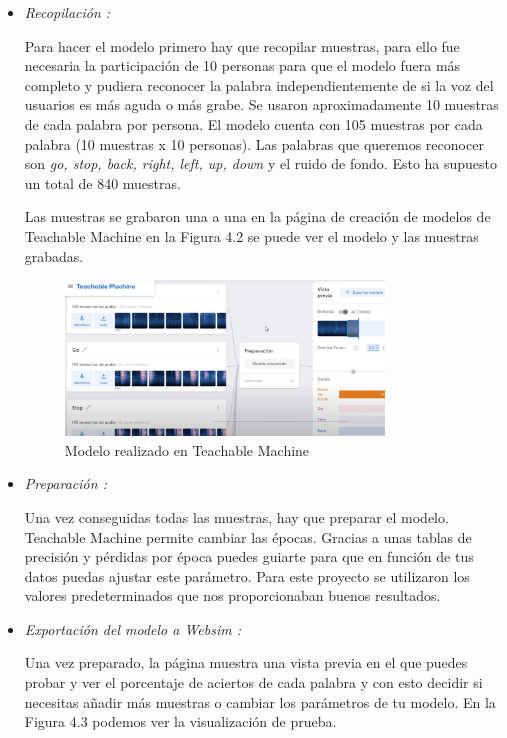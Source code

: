 \begin{itemize}
\item \textit{Recopilación :}

Para hacer el modelo primero hay que recopilar muestras, para ello fue necesaria la participación de 10 personas para que el modelo fuera más completo y pudiera reconocer la palabra independientemente de si la voz del usuarios es más aguda o más grabe.  Se usaron aproximadamente 10 muestras de cada palabra por persona. El modelo cuenta con 105 muestras por cada palabra (10 muestras x 10 personas). Las palabras que queremos reconocer son \textit{go, stop, back, right, left, up, down } y el ruido de fondo. Esto ha supuesto un total de 840 muestras.

Las muestras se grabaron una a una en la página de creación de modelos de Teachable Machine en la Figura 4.2 se puede ver el modelo y las muestras grabadas.


\begin{figure}[H]
 \centering
    \includegraphics[width=0.8\textwidth, height=0.4\textwidth]{chapters/images/teachablemachine.png}
    \caption{Modelo realizado en Teachable Machine}
\end{figure}
 

\item  \textit{Preparación :}

Una vez conseguidas todas las muestras, hay que preparar el modelo. Teachable Machine permite cambiar las épocas. Gracias a unas tablas de precisión y pérdidas por época puedes guiarte para que en función de tus datos puedas ajustar este parámetro. Para este proyecto se utilizaron los valores predeterminados que nos proporcionaban buenos resultados.

\item  \textit{Exportación del modelo a Websim :}

Una vez preparado, la página muestra una vista previa en el que puedes probar y ver el porcentaje de aciertos de cada palabra y con esto decidir si necesitas añadir más muestras o cambiar los parámetros de tu modelo.  En la Figura 4.3 podemos ver la visualización de prueba.


\end{itemize}

